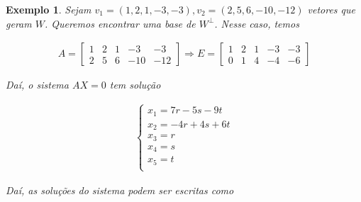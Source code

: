 \documentclass{article}
\newtheorem*{example}{Exemplo}
\begin{document}
\begin{example}
	Sejam $v_1 = (1, 2, 1, -3, -3), v_2 = (2, 5, 6, -10, -12)$ vetores que geram $W$. Queremos encontrar uma base de $W^{\perp}$. Nesse caso, temos
	
	\begin{align*}
	A = \begin{bmatrix}
	1 & 2 & 1 & -3 & -3 \\
	2 & 5 & 6 & -10 & -12
	\end{bmatrix}\Rightarrow E = \begin{bmatrix}
	1 & 2 & 1 & -3 & -3 \\
	0 & 1 & 4 & -4 & -6
	\end{bmatrix}
	\end{align*}
	
	\par\vspace{0.3cm} Daí, o sistema $AX = 0$ tem solução
	
	\begin{align*}
	\begin{cases}
	x_1 = 7r - 5s - 9t\\
	x_2 = -4r + 4s + 6t \\
	x_3 = r \\
	x_4 = s \\
	x_5 = t \\	
	\end{cases}
	\end{align*}
	
	\par\vspace{0.3cm} Daí, as soluções do sistema podem ser escritas como
	

\end{example}
\end{document}
